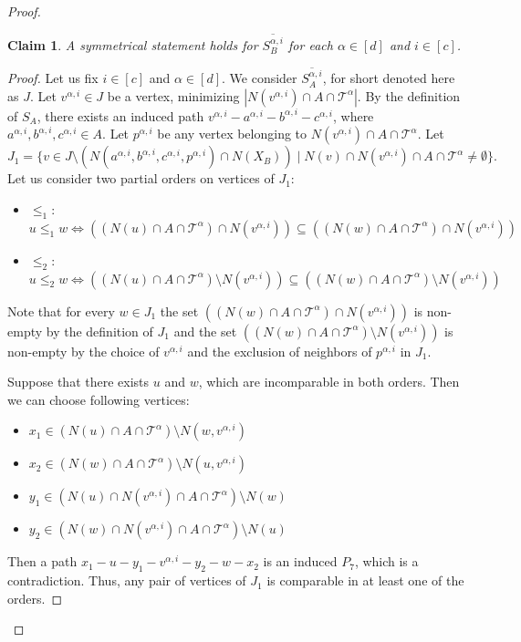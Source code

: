 \documentclass[11pt,a4paper]{article}
\newtheorem{claim}[theorem]{Claim}
\theoremstyle{definition}
\renewcommand{\varnothing}{\emptyset}
\def\T{\mathcal{T}}
\begin{document}
\begin{proof}
\begin{claim}
A symmetrical statement holds for $\overline{S_B^{\alpha,i}}$ for each $\alpha\in [d]$ and $i\in[c]$.
\end{claim}
\begin{proof}
    Let us fix $i\in[c]$ and $\alpha\in [d]$. 
    We consider $\overline{S_A^{\alpha, i}}$, for short denoted here as $J$. 
    Let $v^{\alpha, i}\in J$ be a vertex, minimizing $|N(v^{\alpha, i})\cap A\cap \T^\alpha|$. 
    By the definition of $S_A$, there exists an induced path $v^{\alpha, i} - a^{\alpha, i} - b^{\alpha, i} -c^{\alpha,i}$, where $a^{\alpha,i}, b^{\alpha, i}, c^{\alpha, i} \in A$. Let $p^{\alpha, i}$ be any vertex belonging to $N(v^{\alpha, i})\cap A\cap \T^\alpha$. 
    Let $$J_1 = \{v \in J\setminus (N(a^{\alpha,i}, b^{\alpha,i}, c^{\alpha, i}, p^{\alpha, i})\cap N(X_B)) \mid N(v)\cap N(v^{\alpha, i})\cap A \cap \T^\alpha \neq \varnothing\}.$$ 
    Let us consider two partial orders on vertices of $J_1$:
    \begin{itemize}
        \item $\leq_1:$ $u\leq_1 w \Leftrightarrow \left((N(u)\cap A\cap \T^\alpha)\cap N(v^{\alpha, i})\right) \subseteq \left((N(w)\cap A\cap \T^\alpha)\cap N(v^{\alpha, i})\right)$ 
        \item $\leq_2:$ $u\leq_2 w \Leftrightarrow \left((N(u)\cap A\cap \T^\alpha)\setminus N(v^{\alpha, i})\right) \subseteq \left((N(w)\cap A\cap \T^\alpha)\setminus N(v^{\alpha, i})\right)$
    \end{itemize}
    Note that for every $w\in J_1$ the set $\left((N(w)\cap A\cap \T^\alpha)\cap N(v^{\alpha, i})\right)$ is non-empty by the definition of $J_1$ and the set $\left((N(w)\cap A\cap \T^\alpha)\setminus N(v^{\alpha, i})\right)$ is non-empty by the choice of  $v^{\alpha, i}$ and the exclusion of neighbors of $p^{\alpha, i}$ in $J_1$.
    
    Suppose that there exists $u$ and $w$, which are incomparable in both orders. Then we can choose  following vertices: \begin{itemize}
        \item $x_1\in \left(N(u)\cap A\cap \T^\alpha\right) \setminus N(w, v^{\alpha, i})$
        \item $x_2\in \left(N(w)\cap A\cap \T^\alpha\right) \setminus N(u, v^{\alpha, i})$
        \item $y_1 \in \left(N(u)\cap N(v^{\alpha,i})\cap A\cap \T^\alpha \right) \setminus N(w)$
        \item $y_2\in \left(N(w)\cap N(v^{\alpha,i})\cap A\cap \T^\alpha \right) \setminus N(u)$
    \end{itemize}
    Then a path $x_1 -u-y_1 -v^{\alpha, i}-y_2-w-x_2$ is an induced $P_7$, which is a contradiction. Thus, any pair of vertices of $J_1$ is comparable in at least one of the orders. 


\end{proof}
\end{proof}
\end{document}
